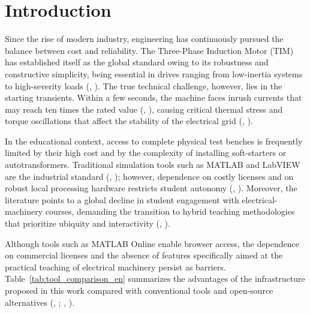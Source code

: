 \documentclass[a4paper]{ifacconf}
\begin{document}

\section{Introduction}

Since the rise of modern industry, engineering has continuously pursued the balance between cost and reliability. The Three-Phase Induction Motor (TIM) has established itself as the global standard owing to its robustness and constructive simplicity, being essential in drives ranging from low-inertia systems to high-severity loads (\citeauthor{Umans2014EN}, \citeyear{Umans2014EN}). The true technical challenge, however, lies in the starting transients. Within a few seconds, the machine faces inrush currents that may reach ten times the rated value (\citeauthor{jain2014modeling}, \citeyear{jain2014modeling}), causing critical thermal stress and torque oscillations that affect the stability of the electrical grid (\citeauthor{ikeda2007simulation}, \citeyear{ikeda2007simulation}).

In the educational context, access to complete physical test benches is frequently limited by their high cost and by the complexity of installing soft-starters or autotransformers. Traditional simulation tools such as MATLAB and LabVIEW are the industrial standard (\citeauthor{aktaibi2011dynamic}, \citeyear{aktaibi2011dynamic}); however, dependence on costly licenses and on robust local processing hardware restricts student autonomy (\citeauthor{leedy2013simulink}, \citeyear{leedy2013simulink}). Moreover, the literature points to a global decline in student engagement with electrical-machinery courses, demanding the transition to hybrid teaching methodologies that prioritize ubiquity and interactivity (\citeauthor{singh2019improving}, \citeyear{singh2019improving}).

Although tools such as MATLAB Online enable browser access, the dependence on commercial licenses and the absence of features specifically aimed at the practical teaching of electrical machinery persist as barriers. Table~\ref{tab:tool_comparison_en} summarizes the advantages of the infrastructure proposed in this work compared with conventional tools and open-source alternatives (\citeauthor{li2010simulation}, \citeyear{li2010simulation}; \citeauthor{leedy2013simulink}, \citeyear{leedy2013simulink}).
\end{document}
